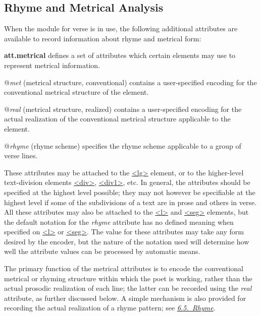 \subsection[{Rhyme and Metrical Analysis}]{Rhyme and Metrical Analysis}\label{VEME}\par
When the module for verse is in use, the following additional attributes are available to record information about rhyme and metrical form: 
\begin{sansreflist}
  
\item [\textbf{att.metrical}] defines a set of attributes which certain elements may use to represent metrical information.\hfil\\[-10pt]\begin{sansreflist}
    \item[@{\itshape met}]
  (metrical structure, conventional) contains a user-specified encoding for the conventional metrical structure of the element.
    \item[@{\itshape real}]
  (metrical structure, realized) contains a user-specified encoding for the actual realization of the conventional metrical structure applicable to the element.
    \item[@{\itshape rhyme}]
  (rhyme scheme) specifies the rhyme scheme applicable to a group of verse lines.
\end{sansreflist}  
\end{sansreflist}
\par
These attributes may be attached to the \hyperref[TEI.lg]{<lg>} element, or to the higher-level text-division elements \hyperref[TEI.div]{<div>}, \hyperref[TEI.div1]{<div1>}, etc. In general, the attributes should be specified at the highest level possible; they may not however be specifiable at the highest level if some of the subdivisions of a text are in prose and others in verse. All these attributes may also be attached to the \hyperref[TEI.l]{<l>} and \hyperref[TEI.seg]{<seg>} elements, but the default notation for the {\itshape rhyme} attribute has no defined meaning when specified on \hyperref[TEI.l]{<l>} or \hyperref[TEI.seg]{<seg>}. The value for these attributes may take any form desired by the encoder, but the nature of the notation used will determine how well the attribute values can be processed by automatic means.\par
The primary function of the metrical attributes is to encode the conventional metrical or rhyming structure within which the poet is working, rather than the actual prosodic realization of each line; the latter can be recorded using the {\itshape real} attribute, as further discussed below. A simple mechanism is also provided for recording the actual realization of a rhyme pattern; see \textit{\hyperref[VERH]{6.5.\ Rhyme}}.
